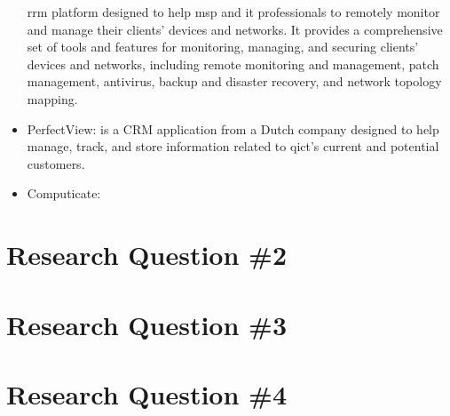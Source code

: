 \begin{multicols}{2}
\begin{itemize}
                  \acrshort{rrm} platform designed to help \acrshort{msp} and \acrshort{it} professionals to
                  remotely monitor and manage their clients' devices and networks. It provides a comprehensive
                  set of tools and features for monitoring, managing, and securing clients' devices and networks,
                  including remote monitoring and management, patch management, antivirus, backup and disaster
                  recovery, and network topology mapping.
            \item PerfectView: is a \gls{CRM} application from a Dutch company designed to help manage, track, and
                  store information related to \acrshort{qict}'s current and potential customers.
            \item Computicate:
      \end{itemize}
      \section{Research Question \#2}
      \section{Research Question \#3}
      \section{Research Question \#4}
\end{multicols}
